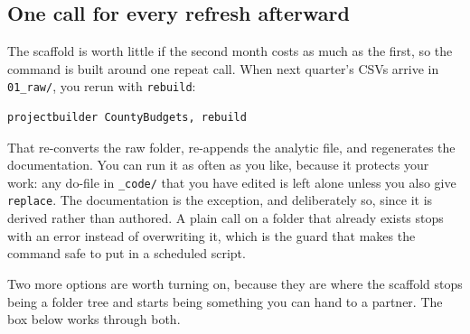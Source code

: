 \documentclass[
    a4paper,
    fontsize=10pt,
    twoside=true,
    numbers=noenddot,
]{kaobook}
\begin{document}
\subsection{One call for every refresh afterward}\label{sec:ch02-pb-rebuild}
The scaffold is worth little if the second month costs as much as the first, so the command is built around one repeat call. When next quarter's CSVs arrive in \texttt{01\_raw/}, you rerun with \texttt{rebuild}:
\par
{\footnotesize
\begin{verbatim}
projectbuilder CountyBudgets, rebuild
\end{verbatim}
}
That re-converts the raw folder, re-appends the analytic file, and regenerates the documentation. You can run it as often as you like, because it protects your work: any do-file in \texttt{\_code/} that you have edited is left alone unless you also give \texttt{replace}. The documentation is the exception, and deliberately so, since it is derived rather than authored. A plain call on a folder that already exists stops with an error instead of overwriting it, which is the guard that makes the command safe to put in a scheduled script.

Two more options are worth turning on, because they are where the scaffold stops being a folder tree and starts being something you can hand to a partner. The box below works through both.
\end{document}
